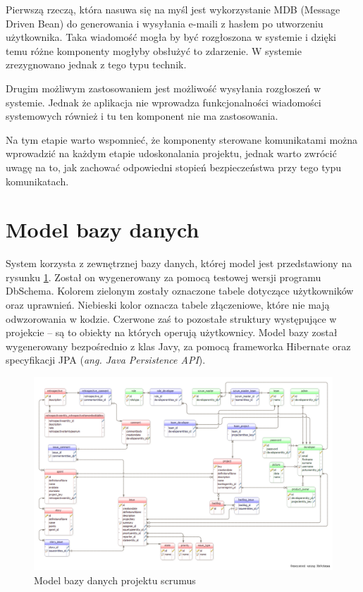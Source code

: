 Pierwszą rzeczą, która nasuwa się na myśl jest wykorzystanie MDB (Message Driven Bean) do generowania i wysyłania e-maili z hasłem po utworzeniu użytkownika. Taka wiadomość mogła by być rozgłoszona w systemie i dzięki temu różne komponenty mogłyby obsłużyć to zdarzenie. W systemie zrezygnowano jednak z tego typu technik.

Drugim możliwym zastosowaniem jest możliwość wysyłania rozgłoszeń w systemie. Jednak że aplikacja nie wprowadza funkcjonalności wiadomości systemowych również i tu ten komponent nie ma zastosowania.

Na tym etapie warto wspomnieć, że komponenty sterowane komunikatami można wprowadzić na każdym etapie udoskonalania projektu, jednak warto zwrócić uwagę na to, jak zachować odpowiedni stopień bezpieczeństwa przy tego typu komunikatach.

\section{Model bazy danych}
System korzysta z zewnętrznej bazy danych, której model jest przedstawiony na rysunku \ref{fig:modeldb}. Został on wygenerowany za pomocą testowej wersji programu DbSchema. Kolorem zielonym zostały oznaczone tabele dotyczące użytkowników oraz uprawnień. Niebieski kolor oznacza tabele złączeniowe, które nie mają odwzorowania w kodzie. Czerwone zaś to pozostałe struktury występujące w projekcie -- są to obiekty na których operują użytkownicy. Model bazy został wygenerowany bezpośrednio z klas Javy, za pomocą frameworka Hibernate oraz specyfikacji JPA (\textit{ang. Java Persistence API}).

\begin{figure}
	\centering
	\includegraphics[width=25cm]{rysunki/modeldb.png}	
	\caption{Model bazy danych projektu scrumus}
	\label{fig:modeldb}
\end{figure}

